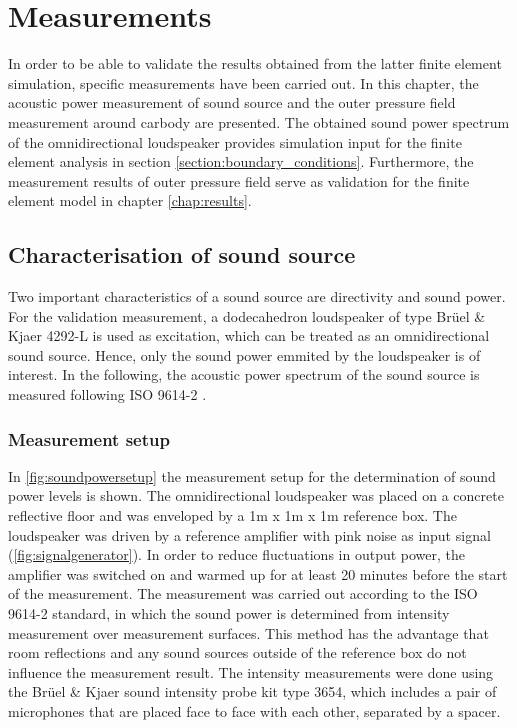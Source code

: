 \chapter{Measurements}
\label{chap:measurement}

In order to be able to validate the results obtained from the latter finite element simulation, specific measurements have been carried out.
In this chapter, the acoustic power measurement of sound source and the outer pressure field measurement around carbody are presented.
The obtained sound power spectrum of the omnidirectional loudspeaker provides simulation input for the finite element analysis in section \ref{section:boundary_conditions}.
Furthermore, the measurement results of outer pressure field serve as validation for the finite element model in chapter \ref{chap:results}.

\section{Characterisation of sound source}
\label{section:SWL_measurement}

Two important characteristics of a sound source are directivity and sound power. For the validation measurement, a dodecahedron loudspeaker of type Brüel \& Kjaer 4292-L is used as excitation, which can be treated as an omnidirectional sound source.
Hence, only the sound power emmited by the loudspeaker is of interest.
In the following, the acoustic power spectrum of the sound source is measured following ISO 9614-2 \cite{din19969614}.

\subsection*{Measurement setup}

In \cref{fig:soundpowersetup} the measurement setup for the determination of sound power levels is shown.
The omnidirectional loudspeaker was placed on a concrete reflective floor and was enveloped by a 1m x 1m x 1m reference box.
The loudspeaker was driven by a reference amplifier with pink noise as input signal (\cref{fig:signalgenerator}).
In order to reduce fluctuations in output power, the amplifier was switched on and warmed up for at least 20 minutes before the start of the measurement.
The measurement was carried out according to the ISO 9614-2 standard, in which the sound power is determined from intensity measurement over measurement surfaces.
This method has the advantage that room reflections and any sound sources outside of the reference box do not influence the measurement result.
The intensity measurements were done using the Brüel \& Kjaer sound intensity probe kit type 3654, which includes a pair of microphones that are placed face to face with each other, separated by a spacer.

